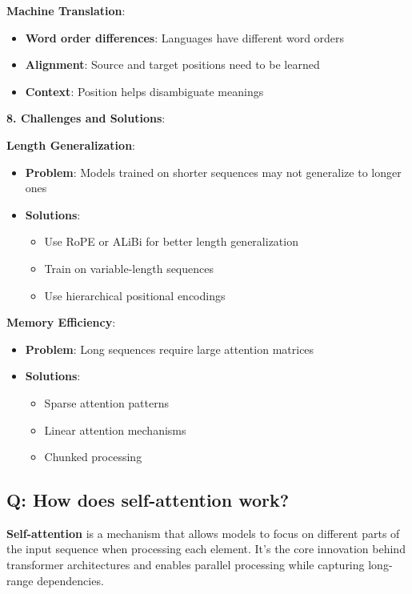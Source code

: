 \textbf{Machine Translation}:
\begin{itemize}
	\item \textbf{Word order differences}: Languages have different word orders
	\item \textbf{Alignment}: Source and target positions need to be learned
	\item \textbf{Context}: Position helps disambiguate meanings
\end{itemize}

\textbf{8. Challenges and Solutions}:

\textbf{Length Generalization}:
\begin{itemize}
	\item \textbf{Problem}: Models trained on shorter sequences may not generalize to longer ones
	\item \textbf{Solutions}:
	      \begin{itemize}
		      \item Use RoPE or ALiBi for better length generalization
		      \item Train on variable-length sequences
		      \item Use hierarchical positional encodings
	      \end{itemize}
\end{itemize}

\textbf{Memory Efficiency}:
\begin{itemize}
	\item \textbf{Problem}: Long sequences require large attention matrices
	\item \textbf{Solutions}:
	      \begin{itemize}
		      \item Sparse attention patterns
		      \item Linear attention mechanisms
		      \item Chunked processing
	      \end{itemize}
\end{itemize}

\subsection*{Q: How does self-attention work?}
\textbf{Self-attention} is a mechanism that allows models to focus on different parts of the input sequence when processing each element. It's the core innovation behind transformer architectures and enables parallel processing while capturing long-range dependencies.

